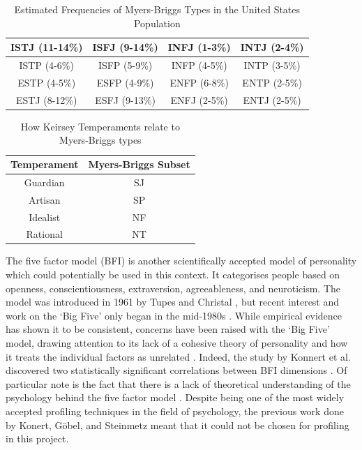\documentclass[12pt,a4paper,twoside]{report}
\begin{document}
\begin{table}
\begin{center}
\begin{tabular}{|c|c|c|c|}
	\hline ISTJ (11-14\%) & ISFJ (9-14\%) & INFJ (1-3\%) & INTJ (2-4\%) \\ 
	\hline ISTP (4-6\%) & ISFP (5-9\%) & INFP (4-5\%) & INTP (3-5\%) \\ 
	\hline ESTP (4-5\%) & ESFP (4-9\%) & ENFP (6-8\%) & ENTP (2-5\%) \\ 
	\hline ESTJ (8-12\%) & ESFJ (9-13\%) & ENFJ (2-5\%) & ENTJ (2-5\%) \\ 
	\hline 
\end{tabular}
\end{center}
\caption{Estimated Frequencies of Myers-Briggs Types in the United States Population \cite{mb-freq}}
\label{table:freq}
\end{table}

\begin{table}
\begin{center}
	\begin{tabular}{|c|c|}
		\hline Temperament & Myers-Briggs Subset \\ 
		\hline Guardian & SJ \\ 
		\hline Artisan & SP \\ 
		\hline Idealist & NF \\ 
		\hline Rational & NT \\ 
		\hline 
	\end{tabular} 
\end{center}
\caption{How Keirsey Temperaments relate to Myers-Briggs types \cite{keirsey1998please}}
\label{table:map}
\end{table}

The five factor model (BFI) is another scientifically accepted model of personality which could potentially be used in this context. It categorises people based on openness, conscientiousness, extraversion, agreeableness, and neuroticism. The model was introduced in 1961 by Tupes and Christal \cite{tupes1961}, but recent interest and work on the `Big Five' only began in the mid-1980s \cite{john1999big}. While empirical evidence has shown it to be consistent, concerns have been raised with the `Big Five' model, drawing attention to its lack of a cohesive theory of personality and how it treats the individual factors as unrelated \cite{block2010five} \cite{eysenck1992four}. Indeed, the study by Konnert et al. discovered two statistically significant correlations between BFI dimensions \cite{konertmodeling}. Of particular note is the fact that there is a lack of theoretical understanding of the psychology behind the five factor model \cite{eysenck1992four} \cite{john1999big}. Despite being one of the most widely accepted profiling techniques in the field of psychology, the previous work done by Konert, G{\"o}bel, and Steinmetz \cite{konertmodeling} meant that it could not be chosen for profiling in this project.
\end{document}
